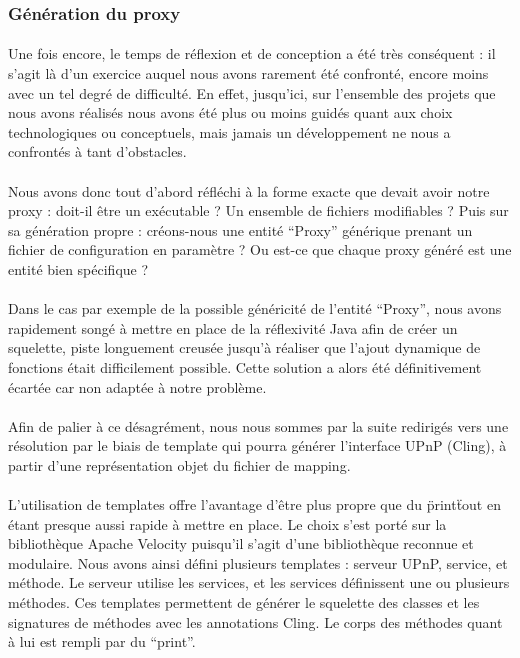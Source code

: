 \documentclass[nocopyrightspace]{sigplanconf}
\begin{document}
		\subsubsection{Génération du proxy}
			\paragraph{}
			Une fois encore, le temps de réflexion et de conception a été très conséquent : il s’agit là d’un exercice auquel nous avons rarement été confronté, encore moins avec un tel degré de difficulté. En effet, jusqu’ici, sur l’ensemble des projets que nous avons réalisés nous avons été plus ou moins guidés quant aux choix technologiques ou conceptuels, mais jamais un développement ne nous a confrontés à tant d’obstacles.

			\paragraph{}
			Nous avons donc tout d’abord réfléchi à la forme exacte que devait avoir notre proxy : doit-il être un exécutable ? Un ensemble de fichiers modifiables ? Puis sur sa génération propre : créons-nous une entité “Proxy” générique prenant un fichier de configuration en paramètre ? Ou est-ce que chaque proxy généré est une entité bien spécifique ?

			\paragraph{}
			Dans le cas par exemple de la possible généricité de l’entité “Proxy”, nous avons rapidement songé à mettre en place de la réflexivité Java afin de créer un squelette, piste longuement creusée jusqu’à réaliser que l’ajout dynamique de fonctions était difficilement possible. Cette solution a alors été définitivement écartée car non adaptée à notre problème.
			
			\paragraph{}
			Afin de palier à ce désagrément, nous nous sommes par la suite redirigés vers une résolution par le biais de template qui pourra générer l’interface UPnP (Cling), à partir d’une représentation objet du fichier de mapping.

			\paragraph{}
			L'utilisation de templates offre l'avantage d'être plus propre que du \"print\" tout en étant presque aussi rapide à mettre en place. Le choix s'est porté sur la bibliothèque Apache Velocity\cite{velocity} puisqu'il s'agit d'une bibliothèque reconnue et modulaire. Nous avons ainsi défini plusieurs templates : serveur UPnP, service, et méthode. Le serveur utilise les services, et les services définissent une ou plusieurs méthodes. Ces templates permettent de générer le squelette des classes et les signatures de méthodes avec les annotations Cling. Le corps des méthodes quant à lui est rempli par du “print”.
\end{document}
